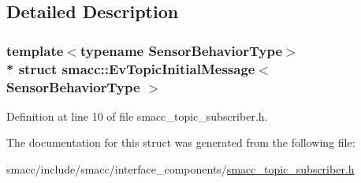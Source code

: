 \subsection{Detailed Description}
\subsubsection*{template$<$typename Sensor\+Behavior\+Type$>$\\*
struct smacc\+::\+Ev\+Topic\+Initial\+Message$<$ Sensor\+Behavior\+Type $>$}



Definition at line 10 of file smacc\+\_\+topic\+\_\+subscriber.\+h.



The documentation for this struct was generated from the following file\+:\begin{DoxyCompactItemize}
\item 
smacc/include/smacc/interface\+\_\+components/\hyperlink{smacc__topic__subscriber_8h}{smacc\+\_\+topic\+\_\+subscriber.\+h}\end{DoxyCompactItemize}
